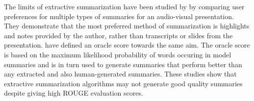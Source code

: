 The limits of extractive summarization have been studied by  by comparing user preferences for multiple types of summaries for an audio-visual presentation. They demonstrate that the most preferred method of summarization is highlights and notes provided by the author, rather than transcripts or slides from the presentation.  have defined an oracle score towards the same aim. The oracle score is based on the maximum likelihood probability of words occuring in model summaries and is in turn used to generate summaries that perform better than any extracted and also human-generated summaries. These studies show that extractive summarization algorithms may not generate good quality summaries despite giving high ROUGE evaluation scores.  


